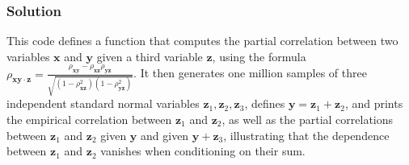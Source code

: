 \documentclass[letterpaper,10pt,english]{jupyterBook}
\begin{document}
\subsubsection{Solution}
\label{\detokenize{01:id13}}
\sphinxAtStartPar
This code defines a function  that computes the partial correlation between two variables \(\mathbf x\) and \(\mathbf y\) given a third variable \(\mathbf z\), using the formula \(\rho_{\mathbf x\mathbf y \cdot \mathbf z} = \frac{\rho_{\mathbf x\mathbf y} - \rho_{\mathbf x\mathbf z}\rho_{\mathbf y\mathbf z}}{\sqrt{(1 - \rho_{\mathbf x\mathbf z}^2)(1 - \rho_{\mathbf y\mathbf z}^2)}}\). It then generates one million samples of three independent standard normal variables \(\mathbf z_1, \mathbf z_2, \mathbf z_3\), defines \(\mathbf y = \mathbf z_1 + \mathbf z_2\), and prints the empirical correlation between \(\mathbf z_1\) and \(\mathbf z_2\), as well as the partial correlations between \(\mathbf z_1\) and \(\mathbf z_2\) given \(\mathbf y\) and given \(\mathbf y + \mathbf z_3\), illustrating that the dependence between \(\mathbf z_1\) and \(\mathbf z_2\) vanishes when conditioning on their sum.
\end{document}
